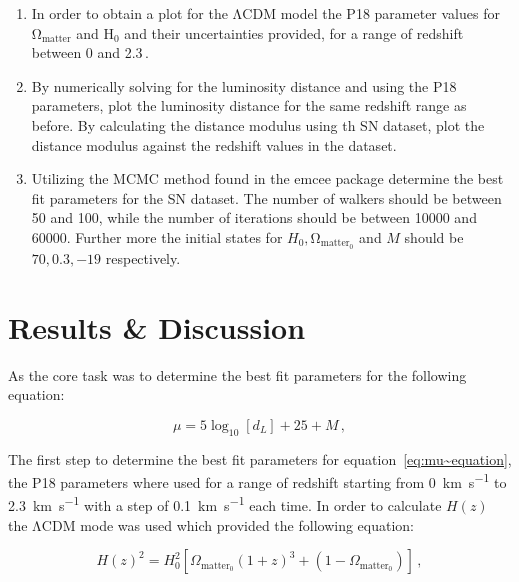 \documentclass[12pt, a4paper]{article}
\begin{document}
        \begin{enumerate}
            \item In order to obtain a plot for the \(\mathrm{\Lambda}\)CDM model the P18 parameter values for \(\mathrm{\Omega}_{\mathrm{matter}}\) and H\(_0\) and their uncertainties provided, for a range of redshift between 0 and 2.3\,.
            \item By numerically solving for the luminosity distance and using the P18 parameters, plot the luminosity distance for the same redshift range as before. By calculating the distance modulus using th SN dataset, plot the distance modulus against the redshift values in the dataset.
            \item Utilizing the MCMC method found in the emcee package determine the best fit parameters for the SN dataset. The number of walkers should be between 50 and 100, while the number of iterations should be between 10000 and 60000. Further more the initial states for \(H_0, \mathrm{\Omega}_{\mathrm{matter_0}}\) and \(M\) should be \(70, 0.3, -19\) respectively.
        \end{enumerate}

\section{Results \& Discussion}

As the core task was to determine the best fit parameters for the following equation:

\begin{equation}
    \mu = 5\log_{10}[d_L]+25+M\,,
    \label{eq:mu~equation}
\end{equation}

The first step to determine the best fit parameters for equation~\ref{eq:mu~equation}, the P18 parameters where used for a range of redshift starting from \qty{0}{km.s^{-1}} to \qty{2.3}{km.s^{-1}} with a step of \qty{0.1}{km.s^{-1}} each time. In order to calculate \(H(z)\) the \(\mathrm{\Lambda}\)CDM mode was used which provided the following equation:

\begin{equation}
    H(z)^2 = H_0^2[\Omega_{\mathrm{matter_0}}(1+z)^3+(1-\Omega_{\mathrm{matter_0}})]\,,
    \label{eq:Hz~equation}
\end{equation}
\end{document}
